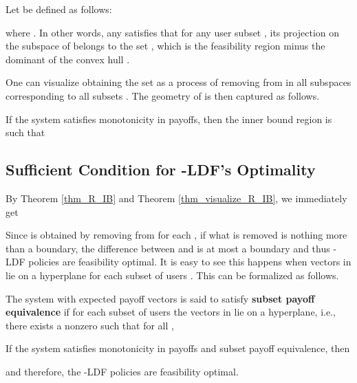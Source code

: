 \documentclass[prodmode,acmtompecs]{acmsmall}
\newcommand{\myComments}[1]{}
\newif\ifinfocom
\newif\ifextended
\newcommand{\infocomStart}{\ifinfocom \myComments{Infocom: }}
\newcommand{\extendedStart}{\ifextended  \myComments{Extended version: }}
\newcommand{\commentEnd}{\myComments{End}}
\begin{document}
\begin{definition}
\label{defn_concave_hull}
Let  be defined as follows:

where . 
In other words, any  satisfies that for any user subset , its projection on the subspace of  belongs to the set , which is the feasibility region  minus the dominant of the convex hull . 
\end{definition}

One can visualize obtaining the set  as a process of removing  from  in all subspaces corresponding to all subsets . The geometry of  is then captured as follows. 
\begin{theorem}
\label{thm_visualize_R_IB}
If the system satisfies monotonicity in payoffs, then the inner bound region  is such that

\end{theorem}

\infocomStart
See the extended version of this paper \cite{EXT2} for this somewhat technical proof. 
\commentEnd\fi
\extendedStart
\noindent See Appendix \ref{appendix_pf_thm_visualize_R_IB} for this somewhat intricate argument. 
\commentEnd\fi

\subsection{Sufficient Condition for -LDF's Optimality}

By Theorem \ref{thm_R_IB} and Theorem \ref{thm_visualize_R_IB}, we immediately get

Since  is obtained by removing  from  for each , if what is removed is nothing more than a boundary, the difference between  and  is at most a boundary and thus -LDF policies are feasibility optimal. It is easy to see this happens when vectors in  lie on a hyperplane for each subset of users . This can be formalized as follows. 

\begin{definition}
\label{defn_subset_payoff_equivalence}
The system with expected payoff vectors  is said to satisfy {\bf subset payoff equivalence} if for each subset of users  the vectors in  lie on a hyperplane, i.e., there exists a nonzero  such that for all , 

\end{definition}

\begin{theorem}
\label{thm_sufficient_condition_for_LDF_optimality}
If the system satisfies monotonicity in payoffs and subset payoff equivalence, then 

and therefore, the -LDF policies are feasibility optimal. 
\end{theorem}
\extendedStart
\noindent Please refer to Appendix \ref{appendix_pf_thm_sufficient_condition_for_LDF_optimality} for detailed proof. 
\commentEnd\fi
\end{document}
